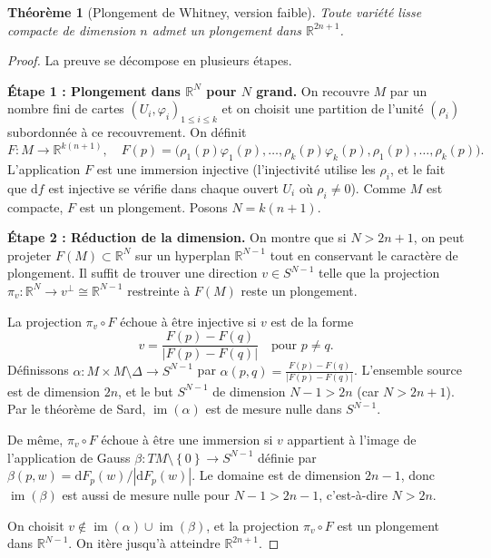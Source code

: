 \documentclass[12pt,a4paper,openany]{book}
\theoremstyle{definition}
\theoremstyle{plain}
\newtheorem{theoreme}[definition]{Théorème}
\theoremstyle{remark}
\newcommand{\R}{\mathbb{R}}
\DeclareMathOperator{\im}{im}
\newcommand{\dd}{\mathrm{d}}
\newcommand{\abs}[1]{\left|#1\right|}
\newcommand{\set}[1]{\left\{#1\right\}}
\begin{document}
\begin{theoreme}[Plongement de Whitney, version faible]\label{thm:whitney-faible}
Toute variété lisse compacte de dimension $n$ admet un plongement dans
$\R^{2n+1}$.
\end{theoreme}

\begin{proof}
La preuve se décompose en plusieurs étapes.

\medskip
\noindent\textbf{Étape 1 : Plongement dans $\R^N$ pour $N$ grand.}
On recouvre $M$ par un nombre fini de cartes $(U_i, \varphi_i)_{1 \leqslant i \leqslant k}$
et on choisit une partition de l'unité $(\rho_i)$ subordonnée à ce recouvrement.
On définit
\[
  F : M \to \R^{k(n+1)}, \quad
  F(p) = \bigl(\rho_1(p)\varphi_1(p), \ldots, \rho_k(p)\varphi_k(p),
    \rho_1(p), \ldots, \rho_k(p)\bigr).
\]
L'application $F$ est une immersion injective (l'injectivité utilise les $\rho_i$,
et le fait que $\dd f$ est injective se vérifie dans chaque ouvert $U_i$ où
$\rho_i \neq 0$). Comme $M$ est compacte, $F$ est un plongement. Posons
$N = k(n+1)$.

\medskip
\noindent\textbf{Étape 2 : Réduction de la dimension.}
On montre que si $N > 2n + 1$, on peut projeter $F(M) \subset \R^N$ sur un
hyperplan $\R^{N-1}$ tout en conservant le caractère de plongement. Il suffit de
trouver une direction $v \in S^{N-1}$ telle que la projection
$\pi_v : \R^N \to v^\perp \cong \R^{N-1}$ restreinte à $F(M)$ reste un
plongement.

La projection $\pi_v \circ F$ échoue à être injective si $v$ est de la forme
\[
  v = \frac{F(p) - F(q)}{\abs{F(p) - F(q)}} \quad \text{pour } p \neq q.
\]
Définissons $\alpha : M \times M \setminus \Delta \to S^{N-1}$ par
$\alpha(p,q) = \frac{F(p)-F(q)}{\abs{F(p)-F(q)}}$. L'ensemble source est de
dimension $2n$, et le but $S^{N-1}$ de dimension $N - 1 > 2n$ (car $N > 2n+1$).
Par le théorème de Sard, $\im(\alpha)$ est de mesure nulle dans $S^{N-1}$.

De même, $\pi_v \circ F$ échoue à être une immersion si $v$ appartient à l'image
de l'application de Gauss $\beta : TM \setminus \set{0} \to S^{N-1}$ définie par
$\beta(p, w) = \dd F_p(w)/\abs{\dd F_p(w)}$. Le domaine est de dimension
$2n - 1$, donc $\im(\beta)$ est aussi de mesure nulle pour $N - 1 > 2n - 1$,
c'est-à-dire $N > 2n$.

On choisit $v \notin \im(\alpha) \cup \im(\beta)$, et la projection $\pi_v \circ F$
est un plongement dans $\R^{N-1}$. On itère jusqu'à atteindre $\R^{2n+1}$.
\end{proof}
\end{document}
